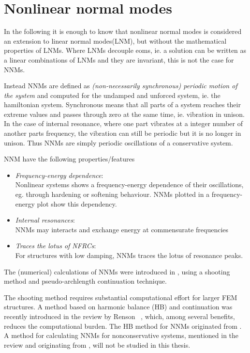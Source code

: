 
\section{Nonlinear normal modes}
\label{sec:nonl-norm-modes}



In the following it is enough to know that nonlinear normal modes is considered
an extension to linear normal modes(LNM), but without the mathematical
properties of LNMs. Where LNMs decouple eoms, ie. a solution can be written as a
linear combinations of LNMs and they are invariant, this is not the case for
NNMs.

Instead NNMs are defined as \textit{(non-necessarily synchronous) periodic
  motion of the system}\autocite{kerschen2009a} and computed for the undamped
and unforced system, ie. the hamiltonian system.
Synchronous means that all parts of a system reaches their extreme values and
passes through zero at the same time, ie. vibration in unison.
In the case of internal resonance, where one part vibrates at a integer number
of another parts frequency, the vibration can still be periodic but it is no
longer in unison. Thus NNMs are simply periodic oscillations of a conservative
system.

NNM have the following properties/features
\begin{itemize}
\item \textit{Frequency-energy dependence}:\\
  Nonlinear systems shows a frequency-energy dependence of their oscillations,
  eg. through hardening or softening behaviour. NNMs plotted in a
  frequency-energy plot show this dependency.
\item \textit{Internal resonances}:\\
  NNMs may interacts and exchange energy at commensurate frequencies
\item \textit{Traces the lotus of NFRCs}:\\
  For structures with low damping, NNMs traces the lotus of resonance peaks.
\end{itemize}


The (numerical) calculations of NNMs were introduced in
\textcite{kerschen2009b}, using a shooting method and pseudo-archlength
continuation technique.

The shooting method requires substantial computational effort for larger FEM
structures. A method based on harmonic balance (HB) and continuation was
recently introduced in the review by Renson~ \autocite{renson2016a}, which, among several
benefits, reduces the computational burden. The HB method for NNMs originated
from \textcite{detroux2016a}. A method for calculating NNMs for nonconservative
systems, mentioned in the review and originating from \textcite{renson2014_phd},
will not be studied in this thesis.

